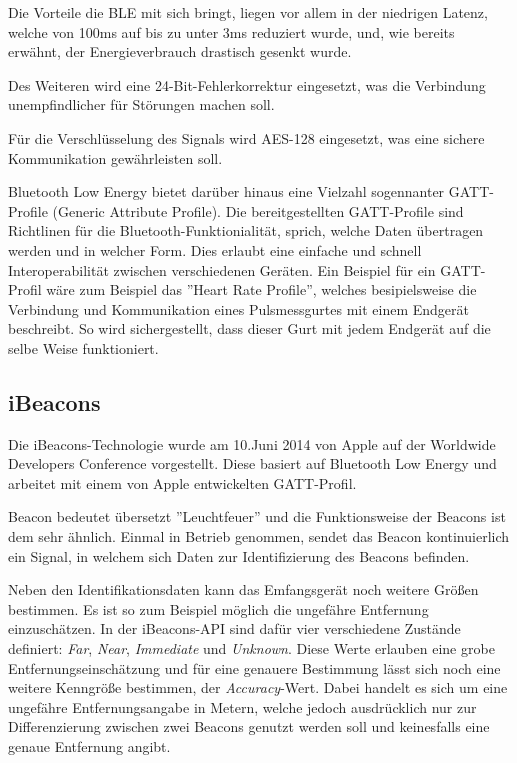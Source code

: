 Die Vorteile die BLE mit sich bringt, liegen vor allem in der niedrigen Latenz, welche von 100ms auf bis zu unter 3ms reduziert wurde, und, wie bereits erwähnt, der Energieverbrauch drastisch gesenkt wurde.

Des Weiteren wird eine 24-Bit-Fehlerkorrektur eingesetzt, was die Verbindung unempfindlicher für Störungen machen soll.

Für die Verschlüsselung des Signals wird AES-128 eingesetzt, was eine sichere Kommunikation gewährleisten soll.

Bluetooth Low Energy bietet darüber hinaus eine Vielzahl sogennanter GATT-Profile (Generic Attribute Profile). Die bereitgestellten GATT-Profile sind Richtlinen für die Bluetooth-Funktionialität, sprich, welche Daten übertragen werden und in welcher Form. Dies erlaubt eine einfache und schnell Interoperabilität zwischen verschiedenen Geräten. Ein Beispiel für ein GATT-Profil wäre zum Beispiel das ''Heart Rate Profile'', welches besipielsweise die Verbindung und Kommunikation eines Pulsmessgurtes mit einem Endgerät beschreibt. So wird sichergestellt, dass dieser Gurt mit jedem Endgerät auf die selbe Weise funktioniert.




\subsection{iBeacons}
\label{sec:technologies:bluetoothLE:ibeacons}
Die iBeacons-Technologie wurde am 10.Juni 2014 von Apple auf der Worldwide Developers Conference vorgestellt. 
Diese basiert auf Bluetooth Low Energy und arbeitet mit einem von Apple entwickelten GATT-Profil.

Beacon bedeutet übersetzt ''Leuchtfeuer'' und die Funktionsweise der Beacons ist dem sehr ähnlich.
Einmal in Betrieb genommen, sendet das Beacon kontinuierlich ein Signal, in welchem sich Daten zur Identifizierung des Beacons befinden.

Neben den Identifikationsdaten kann das Emfangsgerät noch weitere Größen bestimmen. Es ist so zum Beispiel möglich die ungefähre Entfernung einzuschätzen. 
In der iBeacons-API sind dafür vier verschiedene Zustände definiert: \textit{Far}, \textit{Near}, \textit{Immediate} und \textit{Unknown}. Diese Werte erlauben eine grobe Entfernungseinschätzung und für eine genauere Bestimmung lässt sich noch eine weitere Kenngröße bestimmen, der \textit{Accuracy}-Wert. Dabei handelt es sich um eine ungefähre Entfernungsangabe in Metern, welche jedoch ausdrücklich nur zur Differenzierung zwischen zwei Beacons genutzt werden soll und keinesfalls eine genaue Entfernung angibt.


